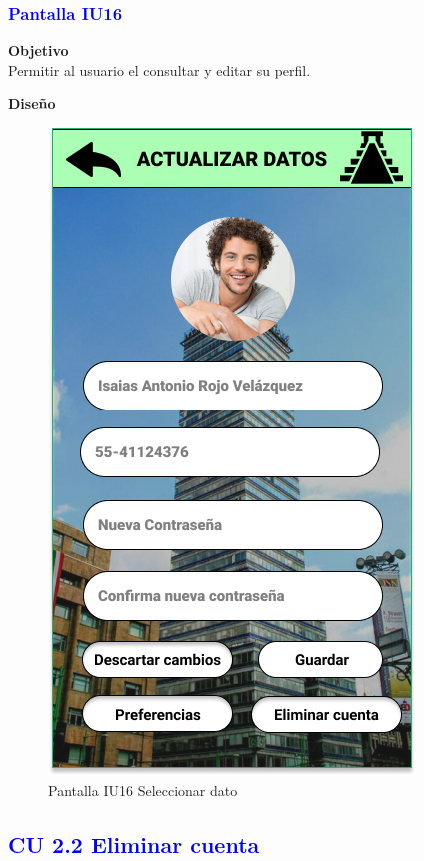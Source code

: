 \subsubsection{\textcolor{blue}{Pantalla IU16}}

\textbf{Objetivo} \\
Permitir al usuario el consultar y editar su perfil.
\vspace{15pt}

\textbf{Diseño}

    \begin{figure}[h]
        
            \centering
            \includegraphics[width=.4\linewidth]{Pantallas Prototipo3/IU16 Pantalla de seleccionar el dato a editar.jpg}
            \caption{Pantalla IU16 Seleccionar dato}
    
    \end{figure}




\subsection{\textcolor{blue}{CU 2.2 Eliminar cuenta}}

